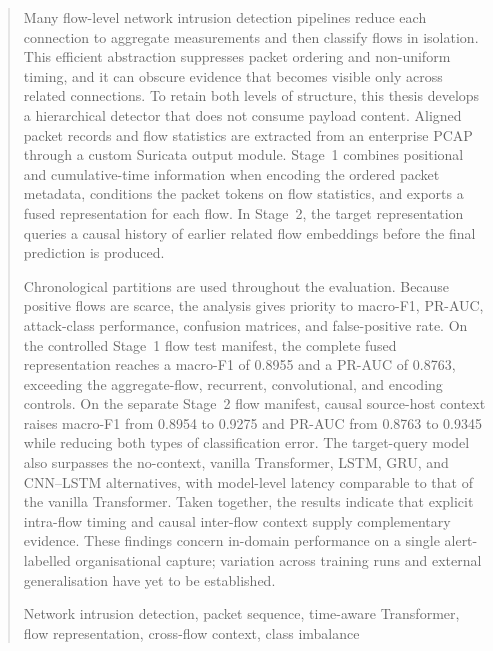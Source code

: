 \documentclass[11pt,fleqn]{report}
\begin{document}
\makecoverpage
\tableofcontents
\begin{abstract}
Many flow-level network intrusion detection pipelines reduce each connection to aggregate measurements and then classify flows in isolation. This efficient abstraction suppresses packet ordering and non-uniform timing, and it can obscure evidence that becomes visible only across related connections. To retain both levels of structure, this thesis develops a hierarchical detector that does not consume payload content. Aligned packet records and flow statistics are extracted from an enterprise PCAP through a custom Suricata output module. Stage~1 combines positional and cumulative-time information when encoding the ordered packet metadata, conditions the packet tokens on flow statistics, and exports a fused representation for each flow. In Stage~2, the target representation queries a causal history of earlier related flow embeddings before the final prediction is produced.

Chronological partitions are used throughout the evaluation. Because positive flows are scarce, the analysis gives priority to macro-F1, PR-AUC, attack-class performance, confusion matrices, and false-positive rate. On the controlled Stage~1 flow test manifest, the complete fused representation reaches a macro-F1 of 0.8955 and a PR-AUC of 0.8763, exceeding the aggregate-flow, recurrent, convolutional, and encoding controls. On the separate Stage~2 flow manifest, causal source-host context raises macro-F1 from 0.8954 to 0.9275 and PR-AUC from 0.8763 to 0.9345 while reducing both types of classification error. The target-query model also surpasses the no-context, vanilla Transformer, LSTM, GRU, and CNN--LSTM alternatives, with model-level latency comparable to that of the vanilla Transformer. Taken together, the results indicate that explicit intra-flow timing and causal inter-flow context supply complementary evidence. These findings concern in-domain performance on a single alert-labelled organisational capture; variation across training runs and external generalisation have yet to be established.

  \begin{keywords}
   Network intrusion detection, packet sequence, time-aware Transformer, flow representation, cross-flow context, class imbalance
  \end{keywords}
\end{abstract}

\end{document}
